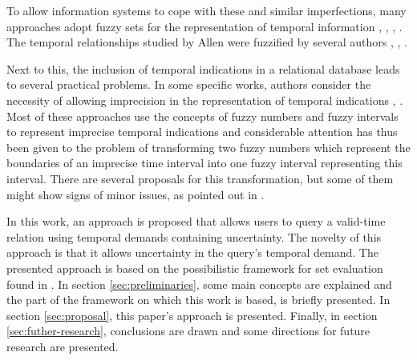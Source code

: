 To allow information systems to cope with these and similar imperfections, many approaches adopt fuzzy sets for the representation of temporal information \cite{343607}, \cite{nagypal03}, \cite{Billiet:Pons:Matthe:DeTre:Pons:2011:BipolarFuzzy}, \cite{Dubois:jucs_9_9:fuzziness_and_uncertainty_in}. The temporal relationships studied by Allen were fuzzified by several authors \cite{ohlbach04}, \cite{nagypal03}, \cite{schockaert08}.

Next to this, the inclusion of temporal indications in a relational database leads to several practical problems. In some specific works, authors consider the necessity of allowing imprecision in the representation of temporal indications \cite{Cru97}, \cite{Garrido2009}. Most of these approaches use the concepts of fuzzy numbers and fuzzy intervals to represent imprecise temporal indications and considerable attention has thus been given to the problem of transforming two fuzzy numbers which represent the boundaries of an imprecise time interval into one fuzzy interval representing this interval. There are several proposals for this transformation, but some of them might show signs of minor issues, as pointed out in \cite{Pon11}. 

In this work, an approach is proposed that allows users to query a valid-time relation using temporal demands containing uncertainty. The novelty of this approach is that it allows uncertainty in the query's temporal demand. The presented approach is based on the possibilistic framework for set evaluation found in \cite{Pon11}. In section \ref{sec:preliminaries}, some main concepts are explained and the part of the framework on which this work is based, is briefly presented. In section \ref{sec:proposal}, this paper's approach is presented. Finally, in section \ref{sec:futher-research}, conclusions are drawn and some directions for future research are presented.


